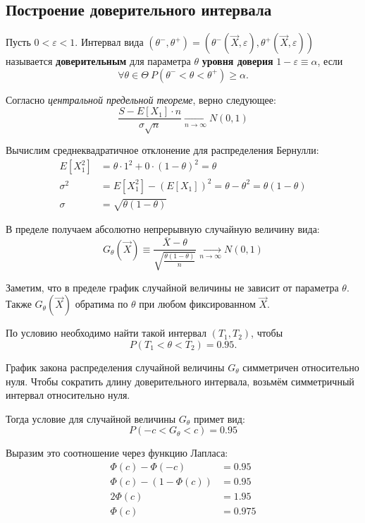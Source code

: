 \subsection{Построение доверительного интервала}

Пусть $0<\varepsilon<1$. Интервал вида $(\theta^-, \theta^+)=(\theta^-(\vec{X}, \varepsilon),\theta^+(\vec{X},\varepsilon))$ называется \textbf{доверительным} для параметра $\theta$ \textbf{уровня доверия} $1-\varepsilon\equiv\alpha$, если
\[
\forall\theta\in\Theta\ P(\theta^−<\theta<\theta^+)\geq \alpha.
\]

Согласно \textit{центральной предельной теореме}, верно следующее:
\[
\dfrac{S-E[X_1]\cdot n}{\sigma\sqrt{n}}\xrightarrow[n\to\infty]{}N(0,1)
\]

Вычислим среднеквадратичное отклонение для распределения Бернулли:
\begin{align*}
    E[X_1^2] &= \theta \cdot 1^2 + 0 \cdot (1-\theta)^2 = \theta \\
    \sigma^2 &= E[X_1^2] - (E[X_1])^2 = \theta - \theta^2 = \theta(1-\theta) \\
    \sigma &= \sqrt{\theta(1-\theta)}
\end{align*}

В пределе получаем абсолютно непрерывную случайную величину вида:
\[
G_\theta(\vec{X})\equiv\dfrac{\overline{X} - \theta}{\sqrt{\frac{\theta(1-\theta)}{n}}}\xrightarrow[n\to\infty]{}N(0,1)
\]

Заметим, что в пределе график случайной величины не зависит от параметра \( \theta \). Также \( G_\theta(\vec{X}) \) обратима по \( \theta \) при любом фиксированном \( \vec{X} \).

По условию необходимо найти такой интервал $(T_1, T_2)$, чтобы
\[
P(T_1 < \theta < T_2) = 0.95.
\]

График закона распределения случайной величины \( G_\theta \) симметричен относительно нуля. Чтобы сократить длину доверительного интервала, возьмём симметричный интервал относительно нуля.

Тогда условие для случайной величины $G_\theta$ примет вид:
\[
    P(-c<G_\theta<c)=0.95
\]

Выразим это соотношение через функцию Лапласа:
\[
    \begin{aligned}
        \Phi(c) - \Phi(-c) &= 0.95 \\
        \Phi(c) - (1 - \Phi(c)) &= 0.95 \\
        2\Phi(c) &= 1.95 \\
        \Phi(c) &= 0.975
    \end{aligned}
\]

